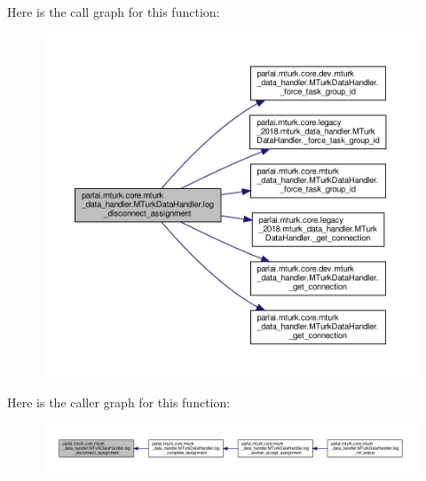 Here is the call graph for this function\+:
\nopagebreak
\begin{figure}[H]
\begin{center}
\leavevmode
\includegraphics[width=350pt]{classparlai_1_1mturk_1_1core_1_1mturk__data__handler_1_1MTurkDataHandler_ac4dc07d7412b426c29678b517daf6094_cgraph}
\end{center}
\end{figure}
Here is the caller graph for this function\+:
\nopagebreak
\begin{figure}[H]
\begin{center}
\leavevmode
\includegraphics[width=350pt]{classparlai_1_1mturk_1_1core_1_1mturk__data__handler_1_1MTurkDataHandler_ac4dc07d7412b426c29678b517daf6094_icgraph}
\end{center}
\end{figure}
\mbox{\label{classparlai_1_1mturk_1_1core_1_1mturk__data__handler_1_1MTurkDataHandler_a9395320d0c2a2f00416acd381b5ae0ba}} 
